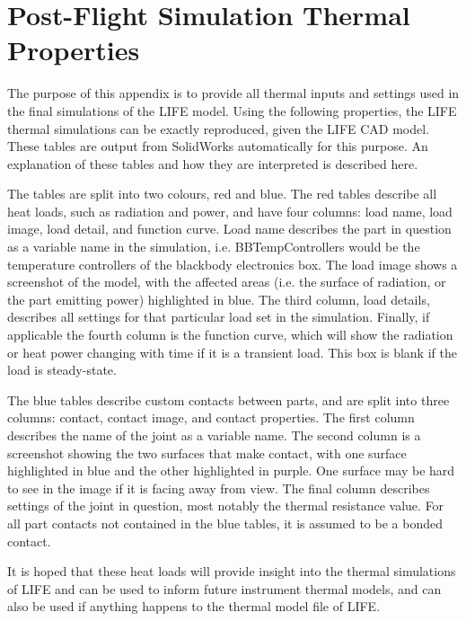 \chapter{Post-Flight Simulation Thermal Properties}\label{post_flight_thermal_properties_appendix}

The purpose of this appendix is to provide all thermal inputs and settings used in the final simulations of the LIFE model. Using the following properties, the LIFE thermal simulations can be exactly reproduced, given the LIFE CAD model. These tables are output from SolidWorks automatically for this purpose. An explanation of these tables and how they are interpreted is described here.

The tables are split into two colours, red and blue. The red tables describe all heat loads, such as radiation and power, and have four columns: load name, load image, load detail, and function curve. Load name describes the part in question as a variable name in the simulation, i.e. BB{\textunderscore}Temp{\textunderscore}Controllers would be the temperature controllers of the blackbody electronics box. The load image shows a screenshot of the model, with the affected areas (i.e. the surface of radiation, or the part emitting power) highlighted in blue. The third column, load details, describes all settings for that particular load set in the simulation. Finally, if applicable the fourth column is the function curve, which will show the radiation or heat power changing with time if it is a transient load. This box is blank if the load is steady-state.

The blue tables describe custom contacts between parts, and are split into three columns: contact, contact image, and contact properties. The first column describes the name of the joint as a variable name. The second column is a screenshot showing the two surfaces that make contact, with one surface highlighted in blue and the other highlighted in purple. One surface may be hard to see in the image if it is facing away from view. The final column describes settings of the joint in question, most notably the thermal resistance value. For all part contacts not contained in the blue tables, it is assumed to be a bonded contact.

It is hoped that these heat loads will provide insight into the thermal simulations of LIFE and can be used to inform future instrument thermal models, and can also be used if anything happens to the thermal model file of LIFE.

\newpage

